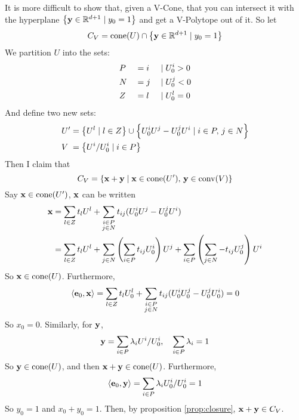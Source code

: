 It is more difficult to show that, given a V-Cone, that you can intersect it with the hyperplane $\left\{\mathbf{y} \in \mathbb{R}^{d+1} \;|\; y_0 = 1\right\}$ and get a V-Polytope out of it.  So let
  \[ C_V = \operatorname{cone}(U) \cap \left\{\mathbf{y} \in \mathbb{R}^{d+1} \;|\; y_0 = 1\right\} \]
We partition $U$ into the sets:
  \begin{alignat*}{3}
  &P &&= i &\;|\; &U^i_{0} > 0 \\
  &N &&= j &\;|\; &U^j_{0} < 0 \\
  &Z &&= l &\;|\; &U^l_{0} = 0
  \end{alignat*}
And define two new sets:
\begin{align*} 
  U'  &= \left\{U^l \;|\; l \in Z\right\} \cup \left\{U^i_{0} U^j - U^j_{0} U^i \;|\; i\in P,\, j\in N\right\} \\
  V\; &= \left\{U^i/U^i_{0} \;|\; i \in P\right\}
\end{align*}
Then I claim that
\begin{equation}\label{eq:cvtopv}
  C_V = \left\{\mathbf{x} + \mathbf{y} \;|\; \mathbf{x}\in\operatorname{cone}(U'),\, \mathbf{y}\in\operatorname{conv}(V)\right\}
\end{equation}
Say $\mathbf{x} \in\operatorname{cone}(U')$, $\mathbf{x}$ can be written
\begin{align*}
\mathbf{x} &= \sum_{l\in Z}t_l U^l + \sum_{\substack{i\in P \\ j\in N}} t_{ij}(U^i_{0} U^j - U^j_{0} U^i) \\
   &= \sum_{l\in Z}t_l U^l + \sum_{j\in N} \left(\sum_{i\in P} t_{ij}U^i_{0}\right) U^j
                             + \sum_{i\in P} \left(\sum_{j\in N} -t_{ij}U^j_{0}\right) U^i
\end{align*}
So $\mathbf{x} \in \operatorname{cone}(U)$.  Furthermore,
\[ \left\langle \mathbf{e}_0, \mathbf{x} \right\rangle = \sum_{l\in Z}t_l U^l_{0} + \sum_{\substack{i\in P \\ j\in N}} t_{ij}(U^i_{0} U^j_{0} - U^j_{0} U^i_{0}) = 0\]
So $x_0 = 0$.  Similarly, for $\mathbf{y}$,
\[ \mathbf{y} = \sum_{i\in P} \lambda_i U^i/U^i_{0},\quad\sum_{i\in P}\lambda_i = 1 \]
So $\mathbf{y} \in \operatorname{cone}(U)$, and then $\mathbf{x} + \mathbf{y} \in \operatorname{cone}(U)$.  Furthermore,
\[ \left\langle \mathbf{e}_0, \mathbf{y} \right\rangle = \sum_{i\in P} \lambda_i U^i_{0}/U^i_{0} = 1\]
So $y_0 = 1$ and $x_0 + y_0 = 1$.  Then, by proposition \ref{prop:closure}, $\mathbf{x} + \mathbf{y} \in C_V$.

